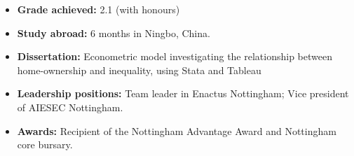 \documentclass[10pt,a4paper,ragged2e]{altacv}
\begin{document}
\begin{itemize}
    \item \textbf{Grade achieved:} 2.1 (with honours)
    \item \textbf{Study abroad:} 6 months in Ningbo, China.
    \item \textbf{Dissertation:} Econometric model investigating the relationship between home-ownership and inequality, using Stata and Tableau
    \item \textbf{Leadership positions:} Team leader in Enactus Nottingham; Vice president of AIESEC Nottingham.
    \item \textbf{Awards:} Recipient of the Nottingham Advantage Award and Nottingham core bursary. 
\end{itemize}
\end{document}
